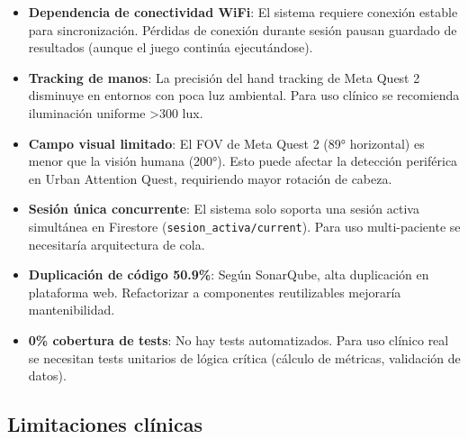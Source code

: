 \begin{itemize}
    \item \textbf{Dependencia de conectividad WiFi}: El sistema requiere conexión estable para sincronización. Pérdidas de conexión durante sesión pausan guardado de resultados (aunque el juego continúa ejecutándose).
    
    \item \textbf{Tracking de manos}: La precisión del hand tracking de Meta Quest 2 disminuye en entornos con poca luz ambiental. Para uso clínico se recomienda iluminación uniforme >300 lux.
    
    \item \textbf{Campo visual limitado}: El FOV de Meta Quest 2 (89° horizontal) es menor que la visión humana (200°). Esto puede afectar la detección periférica en Urban Attention Quest, requiriendo mayor rotación de cabeza.
    
    \item \textbf{Sesión única concurrente}: El sistema solo soporta una sesión activa simultánea en Firestore (\texttt{sesion\_activa/current}). Para uso multi-paciente se necesitaría arquitectura de cola.
    
    \item \textbf{Duplicación de código 50.9\%}: Según SonarQube, alta duplicación en plataforma web. Refactorizar a componentes reutilizables mejoraría mantenibilidad.
    
    \item \textbf{0\% cobertura de tests}: No hay tests automatizados. Para uso clínico real se necesitan tests unitarios de lógica crítica (cálculo de métricas, validación de datos).
\end{itemize}

\subsection{Limitaciones clínicas}


